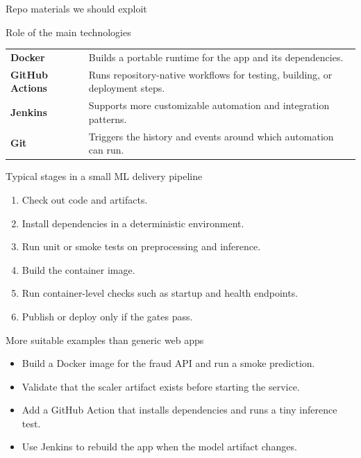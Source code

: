 \begin{frame}{Repo materials we should exploit}
\coursefooter
\end{frame}

\begin{frame}{Role of the main technologies}
\begin{tabularx}{\textwidth}{>{\bfseries}l X}
Docker & Builds a portable runtime for the app and its dependencies. \\
GitHub Actions & Runs repository-native workflows for testing, building, or deployment steps. \\
Jenkins & Supports more customizable automation and integration patterns. \\
Git & Triggers the history and events around which automation can run. \\
\end{tabularx}
\coursefooter
\end{frame}

\begin{frame}{Typical stages in a small ML delivery pipeline}
\begin{enumerate}
\item Check out code and artifacts.
\item Install dependencies in a deterministic environment.
\item Run unit or smoke tests on preprocessing and inference.
\item Build the container image.
\item Run container-level checks such as startup and health endpoints.
\item Publish or deploy only if the gates pass.
\end{enumerate}
\coursefooter
\end{frame}

\begin{frame}{More suitable examples than generic web apps}
\begin{itemize}
\item Build a Docker image for the fraud API and run a smoke prediction.
\item Validate that the scaler artifact exists before starting the service.
\item Add a GitHub Action that installs dependencies and runs a tiny inference test.
\item Use Jenkins to rebuild the app when the model artifact changes.
\end{itemize}
\coursefooter
\end{frame}

